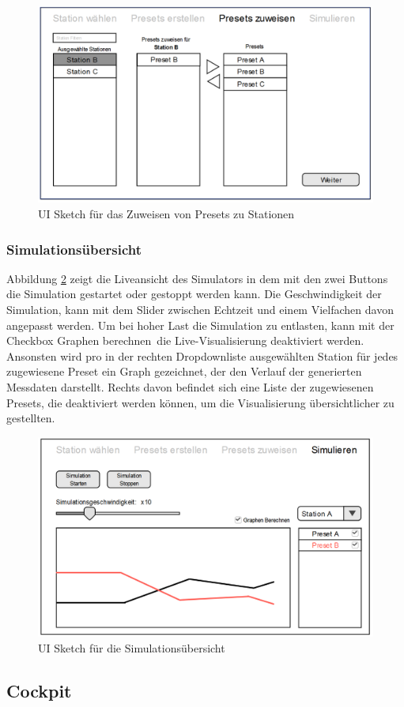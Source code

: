 \begin{figure}[H]
\centering
\includegraphics[width=1\textwidth]{pictures/sketches/simulator/assign_preset.png}
\caption{UI Sketch für das Zuweisen von Presets zu Stationen}
\label{fig:sketch_assign_preset}
\end{figure}
\raggedright

\newpage

\subsubsection{Simulationsübersicht}

Abbildung \ref{fig:sketch_simulation} zeigt die Liveansicht des Simulators in dem mit den zwei Buttons die Simulation gestartet oder gestoppt werden kann. Die Geschwindigkeit der Simulation, kann mit dem Slider zwischen Echtzeit und einem Vielfachen davon angepasst werden. Um bei hoher Last die Simulation zu entlasten, kann mit der Checkbox \glqq Graphen berechnen\grqq\ die Live-Visualisierung deaktiviert werden. Ansonsten wird pro in der rechten Dropdownliste ausgewählten Station für jedes zugewiesene Preset ein Graph gezeichnet, der den Verlauf der generierten Messdaten darstellt. Rechts davon befindet sich eine Liste der zugewiesenen Presets, die deaktiviert werden können, um die Visualisierung übersichtlicher zu gestellten.

\begin{figure}[H]
\centering
\includegraphics[width=1\textwidth]{pictures/sketches/simulator/simulate.png}
\caption{UI Sketch für die Simulationsübersicht}
\label{fig:sketch_simulation}
\end{figure}
\raggedright


\newpage

\subsection{Cockpit}
